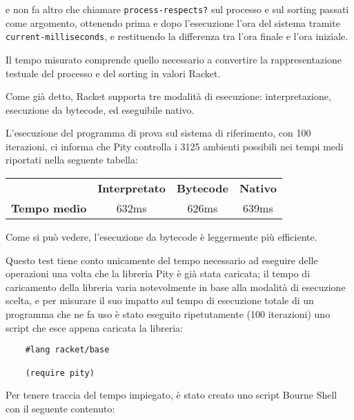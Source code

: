 e non fa altro che chiamare \lstinline{process-respects?} sul processo
e sul sorting passati come argomento, ottenendo prima e dopo l'esecuzione
l'ora del sistema tramite \lstinline{current-milliseconds}, e restituendo
la differenza tra l'ora finale e l'ora iniziale.

Il tempo misurato comprende quello necessario a convertire la
rappresentazione testuale del processo e del sorting in valori Racket.

Come gi\`a detto, Racket supporta tre modalit\`a di esecuzione:
interpretazione, esecuzione da bytecode, ed eseguibile nativo.

L'esecuzione del programma di prova sul sistema di riferimento, con
100 iterazioni, ci informa che Pity controlla i 3125 ambienti possibili
nei tempi medi riportati nella seguente tabella:

\vspace{3mm}
\begin{center}
\begin{tabular}{r c c c}
&
\textbf{Interpretato}
&
\textbf{Bytecode}
&
\textbf{Nativo}
\\
\textbf{Tempo medio}
&
632ms
&
626ms
&
639ms
\\
\end{tabular}
\end{center}
\vspace{3mm}

Come si pu\`o vedere, l'esecuzione da bytecode \`e leggermente pi\`u
efficiente.

Questo test tiene conto unicamente del tempo necessario ad eseguire
delle operazioni una volta che la libreria Pity \`e gi\`a stata
caricata; il tempo di caricamento della libreria varia notevolmente in
base alla modalit\`a di esecuzione scelta, e per misurare il suo impatto
sul tempo di esecuzione totale di un programma che ne fa uso \`e stato
eseguito ripetutamente (100 iterazioni) uno script che esce appena
caricata la libreria:

\begin{lstlisting}
    #lang racket/base

    (require pity)
\end{lstlisting}

Per tenere traccia del tempo impiegato, \`e stato creato uno script
Bourne Shell con il seguente contenuto:


